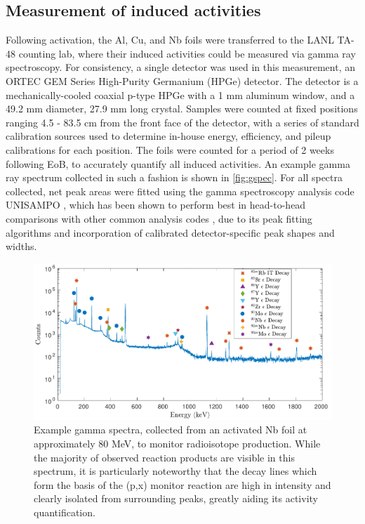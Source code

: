 \documentclass[3p]{elsarticle}
\begin{document}
\subsection{Measurement of induced activities}\label{sec:spectroscopy}


Following activation, the Al, Cu, and Nb foils  were  transferred to the LANL TA-48 counting lab, where their induced activities could be measured via gamma ray spectroscopy.
For consistency, a single detector was used in this measurement, an ORTEC GEM Series  High-Purity Germanium (HPGe) detector.
The detector is a mechanically-cooled coaxial p-type HPGe with a 1 mm aluminum window, and a 49.2 mm diameter, 27.9 mm long crystal.
Samples were counted at fixed positions ranging 4.5 - 83.5  cm from the front face of the detector, with a series of standard calibration sources used to determine in-house energy, efficiency, and pileup calibrations for each position.
The foils were counted for a period of 2 weeks following EoB, to accurately quantify all induced activities.
An example gamma ray spectrum collected in such a fashion is shown in \autoref{fig:gspec}.
For all spectra collected, net peak areas were fitted using the gamma spectroscopy analysis code UNISAMPO \cite{Aarnio2001}, which has been shown to perform best in head-to-head comparisons with other common analysis codes \cite{Jackman2014}, due to its peak fitting algorithms and incorporation  of calibrated detector-specific peak shapes and widths. 

\begin{figure}
 \centering
 \includegraphics[width=6in]{./figures/sample_gspec.pdf}
 \caption{Example gamma spectra, collected from an activated Nb foil at approximately 80 MeV, to monitor radioisotope production. While the majority of observed reaction products are visible in this spectrum, it is particularly noteworthy that the  decay lines which form the basis of the (p,x) monitor reaction are high in intensity and clearly isolated from surrounding peaks, greatly aiding its activity quantification.}
 \label{fig:gspec}
\end{figure}
\end{document}
